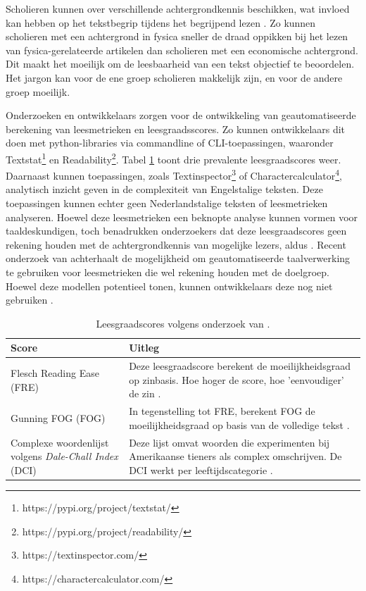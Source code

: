 Scholieren kunnen over verschillende achtergrondkennis beschikken, wat invloed kan hebben op het tekstbegrip tijdens het begrijpend lezen \autocite{DeMeyer2019}. Zo kunnen scholieren met een achtergrond in fysica sneller de draad oppikken bij het lezen van fysica-gerelateerde artikelen dan scholieren met een economische achtergrond. Dit maakt het moeilijk om de leesbaarheid van een tekst objectief te beoordelen. Het jargon kan voor de ene groep scholieren makkelijk zijn, en voor de andere groep moeilijk.

\medspace

Onderzoeken en ontwikkelaars zorgen voor de ontwikkeling van geautomatiseerde berekening van leesmetrieken en leesgraadsscores. Zo kunnen ontwikkelaars dit doen met python-libraries via commandline of CLI-toepassingen, waaronder Textstat\footnote{https://pypi.org/project/textstat/} en Readability\footnote{https://pypi.org/project/readability/}. Tabel \ref{table:readability-scores} toont drie prevalente leesgraadscores weer. Daarnaast kunnen toepassingen, zoals Textinspector\footnote{https://textinspector.com/} of Charactercalculator\footnote{https://charactercalculator.com/}, analytisch inzicht geven in de complexiteit van Engelstalige teksten. Deze toepassingen kunnen echter geen Nederlandstalige teksten of leesmetrieken analyseren. Hoewel deze leesmetrieken een beknopte analyse kunnen vormen voor taaldeskundigen, toch benadrukken onderzoekers dat deze leesgraadscores geen rekening houden met de achtergrondkennis van mogelijke lezers, aldus \autocite{Cantos2019}. Recent onderzoek van \textcite{Crossley2019} achterhaalt de mogelijkheid om geautomatiseerde taalverwerking te gebruiken voor leesmetrieken die wel rekening houden met de doelgroep. Hoewel deze modellen potentieel tonen, kunnen ontwikkelaars deze nog niet gebruiken \autocite{Crossley2019}.

\begin{center}
	\begin{table}[H]
	\begin{tabular}{ | m{5cm} | m{10cm} | } 
		\hline
		\textbf{Score} & \textbf{Uitleg} \\ 
		\hline
		Flesch Reading Ease (FRE) & Deze leesgraadscore berekent de moeilijkheidsgraad op zinbasis. Hoe hoger de score, hoe 'eenvoudiger' de zin \autocite{Cantos2019, Readable2021}. \\
		\hline
		Gunning FOG (FOG) & In tegenstelling tot FRE, berekent FOG de moeilijkheidsgraad op basis van de volledige tekst \autocite{Cantos2019}. \\
		\hline
		Complexe woordenlijst volgens \textit{Dale-Chall Index} (DCI) & Deze lijst omvat woorden die experimenten bij Amerikaanse tieners als complex omschrijven. De DCI werkt per leeftijdscategorie \autocite{Cantos2019}. \\
		\hline
	\end{tabular}
	\caption{Leesgraadscores volgens onderzoek van \textcite{Cantos2019}.}
	\label{table:readability-scores}
	\end{table}
\end{center}

